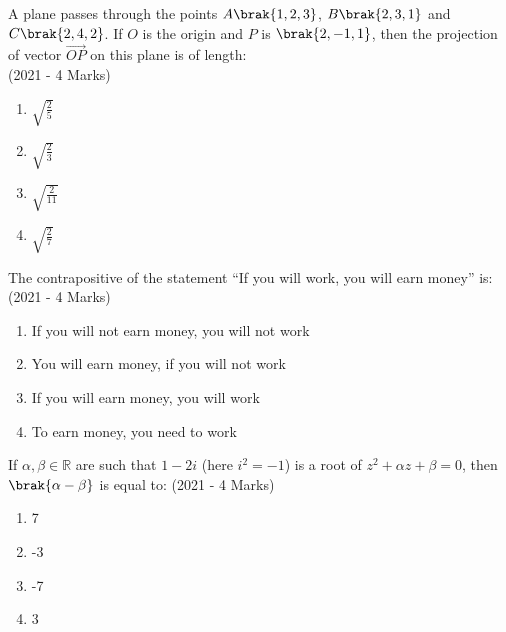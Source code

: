 \iffalse
\title{Assignment 1}
\author{Siddhanth Yellanki - ee24btech11059}
\section{mcq-single}
\fi

    \item{
          	A plane passes through the points $A\brak{1,2,3}$, $B\brak{2,3,1}$ and $C\brak{2,4,2}$. If $O$ is the origin and $P$ is $\brak{2,-1,1}$, then the projection of vector $\overrightarrow{OP}$ on this plane is of length:\\ \text{  }\hfill
                {(2021 - 4 Marks)}
            \begin{multicols}{4}
				\begin{enumerate}
					\item $\sqrt{\frac{2}{5}}$
					
					\item $\sqrt{\frac{2}{3}}$
					
					\item $\sqrt{\frac{2}{11}}$
					
					\item $\sqrt{\frac{2}{7}}$
				\end{enumerate}
			\end{multicols}
            }
    \item{
           	The contrapositive of the statement “If you will work, you will earn money” is: \\ \text{ }\hfill
                {(2021 - 4 Marks)}
                \begin{enumerate}
                   	\item If you will not earn money, you will not work
                   	\item You will earn money, if you will not work
                   	\item If you will earn money, you will work
                   	\item To earn money, you need to work
                \end{enumerate}
        }
\item{
        	
        	If $\alpha, \beta \in \mathbb{R}$ are such that $1 - 2i$ (here $i^2 = -1$) is a root of $z^2 + \alpha z + \beta = 0$, then $\brak{\alpha - \beta}$ is equal to:
        	\hfill
        	{(2021 - 4 Marks)}
        	\begin{multicols}{4}
        		\begin{enumerate}
        			\item 7
        			\item -3
        			\item -7
        			\item 3
        		\end{enumerate}
        	\end{multicols}
        	
        }
